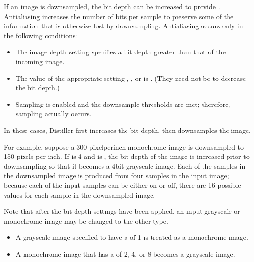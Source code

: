 \documentclass[letterpaper,12pt,english,openany,oneside]{sphinxmanual}
\begin{document}
If an image is downsampled, the bit depth can be increased to provide  . Anti\sphinxhyphen{}aliasing increases the number of bits per sample to preserve some of the information that is otherwise lost by downsampling. Anti\sphinxhyphen{}aliasing occurs only in the following conditions:
\begin{itemize}
\item {} 
The image depth setting specifies a bit depth greater than that of the incoming image.

\item {} 
The value of the appropriate setting  ,  , or  is  . (They need not be  to decrease the bit depth.)

\item {} 
Sampling is enabled and the downsample thresholds are met; therefore, sampling actually occurs.

\end{itemize}

In these cases, Distiller first increases the bit depth, then downsamples the image.

For example, suppose a 300 pixel\sphinxhyphen{}per\sphinxhyphen{}inch monochrome image is downsampled to 150 pixels per inch. If  is 4 and  is  , the bit depth of the image is increased prior to downsampling so that it becomes a 4\sphinxhyphen{}bit grayscale image. Each of the samples in the downsampled image is produced from four samples in the input image; because each of the input samples can be either on or off, there are 16 possible values for each sample in the downsampled image.

Note that after the bit depth settings have been applied, an input grayscale or monochrome image may be changed to the other type.
\begin{itemize}
\item {} 
A grayscale image specified to have a  of 1 is treated as a monochrome image.

\item {} 
A monochrome image that has a  of 2, 4, or 8 becomes a grayscale image.

\end{itemize}
\end{document}

